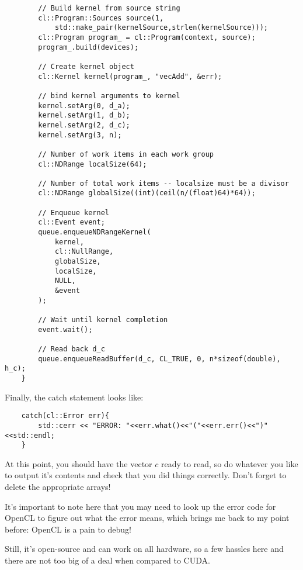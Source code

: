 \documentclass[11pt]{article}
\begin{document}
\begin{lstlisting}
        // Build kernel from source string
        cl::Program::Sources source(1,
            std::make_pair(kernelSource,strlen(kernelSource)));
        cl::Program program_ = cl::Program(context, source);
        program_.build(devices);

        // Create kernel object
        cl::Kernel kernel(program_, "vecAdd", &err);

        // bind kernel arguments to kernel
        kernel.setArg(0, d_a);
        kernel.setArg(1, d_b);
        kernel.setArg(2, d_c);
        kernel.setArg(3, n);

        // Number of work items in each work group
        cl::NDRange localSize(64);

        // Number of total work items -- localsize must be a divisor
        cl::NDRange globalSize((int)(ceil(n/(float)64)*64));

        // Enqueue kernel
        cl::Event event;
        queue.enqueueNDRangeKernel(
            kernel,
            cl::NullRange,
            globalSize,
            localSize,
            NULL,
            &event
        );

        // Wait until kernel completion
        event.wait();

        // Read back d_c
        queue.enqueueReadBuffer(d_c, CL_TRUE, 0, n*sizeof(double), h_c);
    }

\end{lstlisting}

Finally, the catch statement looks like:

\begin{lstlisting}
    catch(cl::Error err){
        std::cerr << "ERROR: "<<err.what()<<"("<<err.err()<<")"<<std::endl;
    }
\end{lstlisting}

At this point, you should have the vector $c$ ready to read, so do whatever you like to output it's contents and check that you did things correctly. Don't forget to delete the appropriate arrays!

It's important to note here that you may need to look up the error code for OpenCL to figure out what the error means, which brings me back to my point before: OpenCL is a pain to debug!

Still, it's open-source and can work on all hardware, so a few hassles here and there are not too big of a deal when compared to CUDA.
\end{document}
